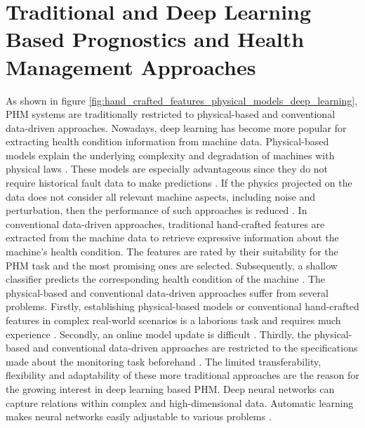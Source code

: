 \section{Traditional and Deep Learning Based Prognostics and Health Management Approaches}
As shown in figure \ref{fig:hand_crafted_features_physical_models_deep_learning}, PHM systems are traditionally restricted to physical-based and conventional data-driven approaches. Nowadays, deep learning has become more popular for extracting health condition information from machine data. Physical-based models explain the underlying complexity and degradation of machines with physical laws \cite{ZHAO2019213}. These models are especially advantageous since they do not require historical fault data to make predictions \cite{Benker2019}. If the physics projected on the data does not consider all relevant machine aspects, including noise and perturbation, then the performance of such approaches is reduced \cite{ZHAO2019213}. In conventional data-driven approaches, traditional hand-crafted features are extracted from the machine data to retrieve expressive information about the machine's health condition. The features are rated by their suitability for the PHM task and the most promising ones are selected. Subsequently, a shallow classifier predicts the corresponding health condition of the machine \cite{ZHAO2019213}. The physical-based and conventional data-driven approaches suffer from several problems. Firstly, establishing physical-based models or conventional hand-crafted features in complex real-world scenarios is a laborious task and requires much experience \cite{ZHAO2019213}. Secondly, an online model update is difficult \cite{ZHAO2019213}. Thirdly, the physical-based and conventional data-driven approaches are restricted to the specifications made about the monitoring task beforehand \cite{ZHAO2019213}. The limited transferability, flexibility and adaptability of these more traditional approaches are the reason for the growing interest in deep learning based PHM. Deep neural networks can capture relations within complex and high-dimensional data. Automatic learning makes neural networks easily adjustable to various problems \cite{ZHAO2019213}.
